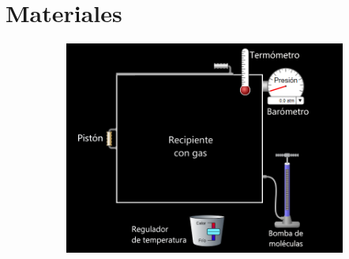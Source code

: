 \documentclass[]{article}
\begin{document}
\section{Materiales}
\begin{figure}[h!]
      \centering
      \includegraphics[width= 12cm, height= 7cm]{imag/Materiales.png}
\end{figure}


\end{document}
